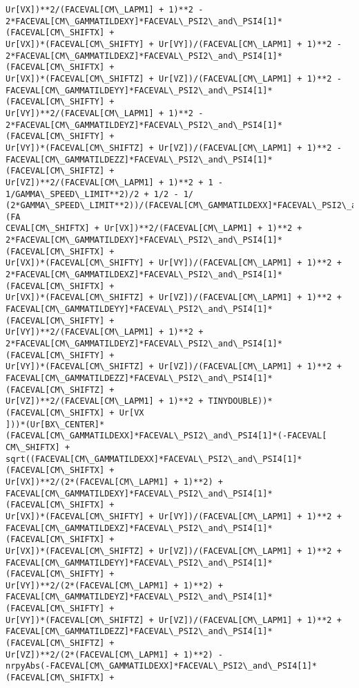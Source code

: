 \documentclass[landscape,letterpaper,10pt,english]{article}
\begin{document}
\begin{Verbatim}[commandchars=\\\{\}]
Ur[VX])**2/(FACEVAL[CM\_LAPM1] + 1)**2 -
2*FACEVAL[CM\_GAMMATILDEXY]*FACEVAL\_PSI2\_and\_PSI4[1]*(FACEVAL[CM\_SHIFTX] +
Ur[VX])*(FACEVAL[CM\_SHIFTY] + Ur[VY])/(FACEVAL[CM\_LAPM1] + 1)**2 -
2*FACEVAL[CM\_GAMMATILDEXZ]*FACEVAL\_PSI2\_and\_PSI4[1]*(FACEVAL[CM\_SHIFTX] +
Ur[VX])*(FACEVAL[CM\_SHIFTZ] + Ur[VZ])/(FACEVAL[CM\_LAPM1] + 1)**2 -
FACEVAL[CM\_GAMMATILDEYY]*FACEVAL\_PSI2\_and\_PSI4[1]*(FACEVAL[CM\_SHIFTY] +
Ur[VY])**2/(FACEVAL[CM\_LAPM1] + 1)**2 -
2*FACEVAL[CM\_GAMMATILDEYZ]*FACEVAL\_PSI2\_and\_PSI4[1]*(FACEVAL[CM\_SHIFTY] +
Ur[VY])*(FACEVAL[CM\_SHIFTZ] + Ur[VZ])/(FACEVAL[CM\_LAPM1] + 1)**2 -
FACEVAL[CM\_GAMMATILDEZZ]*FACEVAL\_PSI2\_and\_PSI4[1]*(FACEVAL[CM\_SHIFTZ] +
Ur[VZ])**2/(FACEVAL[CM\_LAPM1] + 1)**2 + 1 - 1/GAMMA\_SPEED\_LIMIT**2)/2 + 1/2 - 1/
(2*GAMMA\_SPEED\_LIMIT**2))/(FACEVAL[CM\_GAMMATILDEXX]*FACEVAL\_PSI2\_and\_PSI4[1]*(FA
CEVAL[CM\_SHIFTX] + Ur[VX])**2/(FACEVAL[CM\_LAPM1] + 1)**2 +
2*FACEVAL[CM\_GAMMATILDEXY]*FACEVAL\_PSI2\_and\_PSI4[1]*(FACEVAL[CM\_SHIFTX] +
Ur[VX])*(FACEVAL[CM\_SHIFTY] + Ur[VY])/(FACEVAL[CM\_LAPM1] + 1)**2 +
2*FACEVAL[CM\_GAMMATILDEXZ]*FACEVAL\_PSI2\_and\_PSI4[1]*(FACEVAL[CM\_SHIFTX] +
Ur[VX])*(FACEVAL[CM\_SHIFTZ] + Ur[VZ])/(FACEVAL[CM\_LAPM1] + 1)**2 +
FACEVAL[CM\_GAMMATILDEYY]*FACEVAL\_PSI2\_and\_PSI4[1]*(FACEVAL[CM\_SHIFTY] +
Ur[VY])**2/(FACEVAL[CM\_LAPM1] + 1)**2 +
2*FACEVAL[CM\_GAMMATILDEYZ]*FACEVAL\_PSI2\_and\_PSI4[1]*(FACEVAL[CM\_SHIFTY] +
Ur[VY])*(FACEVAL[CM\_SHIFTZ] + Ur[VZ])/(FACEVAL[CM\_LAPM1] + 1)**2 +
FACEVAL[CM\_GAMMATILDEZZ]*FACEVAL\_PSI2\_and\_PSI4[1]*(FACEVAL[CM\_SHIFTZ] +
Ur[VZ])**2/(FACEVAL[CM\_LAPM1] + 1)**2 + TINYDOUBLE))*(FACEVAL[CM\_SHIFTX] + Ur[VX
]))*(Ur[BX\_CENTER]*(FACEVAL[CM\_GAMMATILDEXX]*FACEVAL\_PSI2\_and\_PSI4[1]*(-FACEVAL[
CM\_SHIFTX] +
sqrt((FACEVAL[CM\_GAMMATILDEXX]*FACEVAL\_PSI2\_and\_PSI4[1]*(FACEVAL[CM\_SHIFTX] +
Ur[VX])**2/(2*(FACEVAL[CM\_LAPM1] + 1)**2) +
FACEVAL[CM\_GAMMATILDEXY]*FACEVAL\_PSI2\_and\_PSI4[1]*(FACEVAL[CM\_SHIFTX] +
Ur[VX])*(FACEVAL[CM\_SHIFTY] + Ur[VY])/(FACEVAL[CM\_LAPM1] + 1)**2 +
FACEVAL[CM\_GAMMATILDEXZ]*FACEVAL\_PSI2\_and\_PSI4[1]*(FACEVAL[CM\_SHIFTX] +
Ur[VX])*(FACEVAL[CM\_SHIFTZ] + Ur[VZ])/(FACEVAL[CM\_LAPM1] + 1)**2 +
FACEVAL[CM\_GAMMATILDEYY]*FACEVAL\_PSI2\_and\_PSI4[1]*(FACEVAL[CM\_SHIFTY] +
Ur[VY])**2/(2*(FACEVAL[CM\_LAPM1] + 1)**2) +
FACEVAL[CM\_GAMMATILDEYZ]*FACEVAL\_PSI2\_and\_PSI4[1]*(FACEVAL[CM\_SHIFTY] +
Ur[VY])*(FACEVAL[CM\_SHIFTZ] + Ur[VZ])/(FACEVAL[CM\_LAPM1] + 1)**2 +
FACEVAL[CM\_GAMMATILDEZZ]*FACEVAL\_PSI2\_and\_PSI4[1]*(FACEVAL[CM\_SHIFTZ] +
Ur[VZ])**2/(2*(FACEVAL[CM\_LAPM1] + 1)**2) -
nrpyAbs(-FACEVAL[CM\_GAMMATILDEXX]*FACEVAL\_PSI2\_and\_PSI4[1]*(FACEVAL[CM\_SHIFTX] +

\end{Verbatim}
\end{document}
